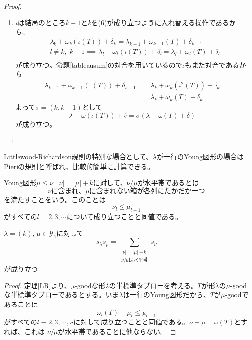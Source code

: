\documentclass{ltjsarticle}
\begin{document}
\begin{proof}
\begin{enumerate}
        \item $\iota$は結局のところ$k-1$と$k$を(6)が成り立つように入れ替える操作であるから、
        \begin{align*}
            &\lambda_{k}+\omega_k(\iota(T))+\delta_k=\lambda_{k-1}+\omega_{k-1}(T)+\delta_{k-1}\\
            & l\neq k,\;k-1\implies \lambda_{l}+\omega_l(\iota(T))+\delta_l=\lambda_{l}+\omega_{l}(T)+\delta_{l}\\
        \end{align*}
        が成り立つ。命題\ref{tableausum}の対合を用いているので$\iota$もまた対合であるから
        \begin{align*}
            \lambda_{k-1}+\omega_{k-1}(\iota(T))+\delta_{k-1}
            &=\lambda_{k}+\omega_{k}(\iota^2(T))+\delta_k\\
            &=\lambda_{k}+\omega_{k}(T)+\delta_k
        \end{align*}
        よって$\sigma=(k, k-1)$として
        \[
            \lambda+\omega(\iota(T))+\delta=\sigma(\lambda+\omega(T)+\delta)
        \]
        が成り立つ。
    \end{enumerate}
\end{proof}



Littlewood-Richardson規則の特別な場合として、$\lambda$が一行のYoung図形の場合はPieriの規則と呼ばれ、比較的簡単に計算できる。

\begin{defin}
    Young図形$\mu\leq \nu$, $|\nu|=|\mu|+k$に対して、$\nu/\mu$が水平帯であるとは
    \[
    \text{
        $\nu$に含まれ、$\mu$に含まれない箱が各列にたかだか一つ
        }
    \]
    を満たすことをいう。このことは
    \[
    \nu_l\leq \mu_{l-1}    
    \]
    がすべての$l=2,3,\cdots$について成り立つことと同値である。
\end{defin}

\begin{theo}[Pieriの規則]\label{Pieri}
    $\lambda=(k)$, $\mu\in\mathcal{Y}_n$に対して
    \[
    s_\lambda s_\mu=\sum_{\substack{|\nu|=|\mu|+k\\\nu/\mu\text{は水平帯}}}s_\nu    
    \]
    が成り立つ
\end{theo}

\begin{proof}
    定理\ref{LR}より、$\mu$-goodな形$\lambda$の半標準タブローを考える。$T$が形$\lambda$の$\mu$-goodな半標準タブローであるとする。いま$\lambda$は一行のYoung図形だから、$T$が$\mu$-goodであることは
    \[
    \omega_{l}(T)+\mu_l\leq \mu_{l-1}    
    \]
    がすべての$l=2,3,\cdots, n$に対して成り立つことと同値である。$\nu=\mu+\omega(T)$とすれば、これは
    $\nu/\mu$が水平帯であることに他ならない。
\end{proof}
\end{document}
